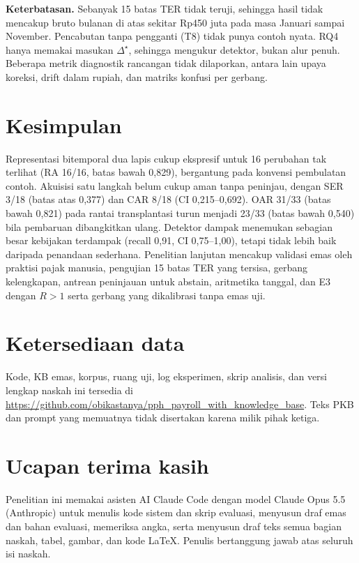 \documentclass[conference]{IEEEtran}
\makeatletter
\DeclareRobustCommand{\en}[1]{{\usefont{\f@encoding}{\f@family}{\f@series}{it}#1\/}}
\newcommand{\emas}{\star}
\makeatother
\begin{document}
\textbf{Keterbatasan.} Sebanyak 15 batas TER tidak teruji, sehingga hasil tidak mencakup bruto bulanan di atas sekitar Rp450 juta pada masa Januari sampai November. Pencabutan tanpa pengganti (T8) tidak punya contoh nyata. RQ4 hanya memakai masukan $\Delta^{\emas}$, sehingga mengukur detektor, bukan alur penuh. Beberapa metrik diagnostik rancangan tidak dilaporkan, antara lain upaya koreksi, \en{drift} dalam rupiah, dan matriks konfusi per gerbang.

\section{Kesimpulan}
\label{sec:kesimpulan}
Representasi bitemporal dua lapis cukup ekspresif untuk 16 perubahan tak terlihat (RA 16/16, batas bawah 0,829), bergantung pada konvensi pembulatan contoh. Akuisisi satu langkah belum cukup aman tanpa peninjau, dengan SER 3/18 (batas atas 0,377) dan CAR 8/18 (CI 0,215--0,692). OAR 31/33 (batas bawah 0,821) pada rantai transplantasi turun menjadi 23/33 (batas bawah 0,540) bila pembaruan dibangkitkan ulang. Detektor dampak menemukan sebagian besar kebijakan terdampak (\en{recall} 0,91, CI 0,75--1,00), tetapi tidak lebih baik daripada penandaan sederhana. Penelitian lanjutan mencakup validasi emas oleh praktisi pajak manusia, pengujian 15 batas TER yang tersisa, gerbang kelengkapan, antrean peninjauan untuk \en{abstain}, aritmetika tanggal, dan E3 dengan $R > 1$ serta gerbang yang dikalibrasi tanpa emas uji.

\section*{Ketersediaan data}
Kode, KB emas, korpus, ruang uji, log eksperimen, skrip analisis, dan versi lengkap naskah ini tersedia di \url{https://github.com/obikastanya/pph_payroll_with_knowledge_base}. Teks PKB dan \en{prompt} yang memuatnya tidak disertakan karena milik pihak ketiga.

\section*{Ucapan terima kasih}
Penelitian ini memakai asisten AI Claude Code dengan model Claude Opus 5.5 (Anthropic) untuk menulis kode sistem dan skrip evaluasi, menyusun draf emas dan bahan evaluasi, memeriksa angka, serta menyusun draf teks semua bagian naskah, tabel, gambar, dan kode \LaTeX{}. Penulis bertanggung jawab atas seluruh isi naskah.



\end{document}
